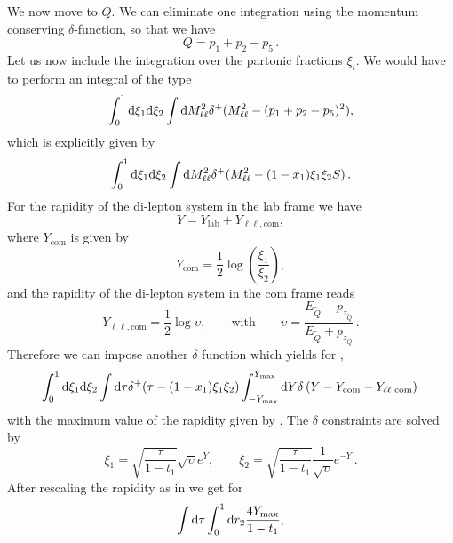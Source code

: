 \documentclass[a4paper,11pt]{article}
\begin{document}
We now move to $Q$. We can eliminate one integration using the momentum conserving
$\delta$-function, so that we have
\begin{equation}
Q = p_1 + p_2 - p_5\, .
\end{equation}
Let us now include the integration over the partonic fractions $\xi_i$. 
We would have to perform an integral of the type
\begin{equation}
\label{eq:phasespacenloQ}
\int^1_0 \mathrm d \xi_1 \mathrm d \xi_2 
\int \mathrm d M^2_{\ell\ell} \delta^+(M^2_{\ell\ell}-(p_1 + p_2 - p_5)^2),
\end{equation}
which is explicitly given by
\begin{equation}
\label{eq:integpartfracts}
\int^1_0 \mathrm d \xi_1 \mathrm d \xi_2 
\int \mathrm d M^2_{\ell\ell} \delta^+(M^2_{\ell\ell} - (1- x_1)\xi_1 \xi_2 S)\,.
\end{equation}
For the rapidity of the di-lepton system in the lab frame we have
\begin{equation}
Y = Y_{\mathrm{lab}} + Y_{\ell\ell,\mathrm{com}},
\end{equation}
where $Y_{\mathrm{com}}$ is given by
\begin{equation}
Y_{\mathrm{com}} = \frac{1}{2}\log\left(\frac{\xi_1}{\xi_2}\right),
\end{equation}
and the rapidity of the di-lepton system in the com frame reads
\begin{equation}
Y_{\ell\ell,\mathrm{com}} = \frac{1}{2}
\log\upsilon , \quad\quad \mathrm{with}\quad\quad
\upsilon  = \frac{E_{\tilde{Q}}-p_{z_{\tilde{Q}}}}{E_{\tilde{Q}}+p_{z_{\tilde{Q}}}}\, .
\end{equation}
Therefore we can impose another $\delta$ function which yields for
,
\begin{equation}
\int^1_0 \mathrm d \xi_1 \mathrm d \xi_2 
\int \mathrm d \tau \delta^+(\tau - (1- x_1)\xi_1 \xi_2)
\int^{Y_{\max}}_{-Y_{\max}} \mathrm d Y 
\delta\left( Y - Y_{\mathrm{com}} - Y_{\ell\ell,\mathrm{com}} \right)\,
\end{equation}
with the maximum value of the rapidity given by .
The $\delta$ constraints are solved by
\begin{equation}
\xi_1 = \sqrt{\frac{\tau}{1-t_1}}\sqrt{\upsilon} e^{Y}, \quad \quad
%
\xi_2 = \sqrt{\frac{\tau}{1-t_1}}\frac{1}{\sqrt{\upsilon}} e^{-Y}\,.
\end{equation}
After rescaling the rapidity as in  we get for 
\begin{equation}
\int \mathrm d \tau \int^1_0 \mathrm d r_2 \frac{4 Y_{\max}}{1-t_1},
\end{equation}
\end{document}
